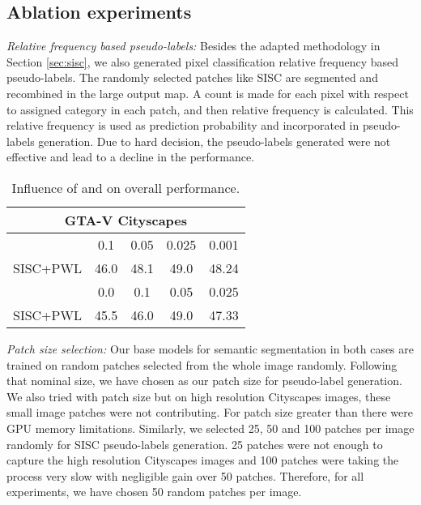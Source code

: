\documentclass[10pt,twocolumn,letterpaper]{article}
\begin{document}
\subsection{Ablation experiments}
\label{sec:abl}
\vspace{-0.1cm}
\textit{Relative frequency based pseudo-labels:} Besides the adapted methodology in Section \ref{sec:sisc}, we also generated pixel classification relative frequency based pseudo-labels. The randomly selected patches like SISC are segmented and recombined in the large output map. A count is made for each pixel with respect to assigned category in each patch, and then relative frequency is calculated. This relative frequency is used as prediction probability and incorporated in pseudo-labels generation. Due to hard decision, the pseudo-labels generated were not effective and lead to a decline in the performance. 
\vspace{-0.2cm}
\begin{table}[H]
\scriptsize
\centering
\caption{Influence of  and  on overall performance.}
\begin{tabular}{ccccc}
\hline
\multicolumn{5}{c}{GTA-V  Cityscapes} \\
\hline
        & 0.1        & 0.05       & 0.025       & 0.001                \\
SISC+PWL           & 46.0       & 48.1       & 49.0        & 48.24   \\
\hline
& 0.0  & 0.1        & 0.05       & 0.025                \\
SISC+PWL           &45.5    & 46.0       & 49.0       & 47.33   \\
\hline
\end{tabular}
\label{table:5}
\vspace{-0.3cm}
\end{table}
\textit{Patch size selection:} Our base models for semantic segmentation in both cases are trained on  random patches selected from the whole image randomly. Following that nominal size, we have chosen  as our patch size for pseudo-label generation. We also tried with  patch size but on high resolution Cityscapes images, these small image patches were not contributing. For patch size greater than  there were GPU memory limitations. Similarly, we selected 25, 50 and 100 patches per image randomly for SISC pseudo-labels generation. 25 patches were not enough to capture the high resolution Cityscapes images and 100 patches were taking the process very slow with negligible gain over 50 patches. Therefore, for all experiments, we have chosen 50 random patches per image.
\end{document}
